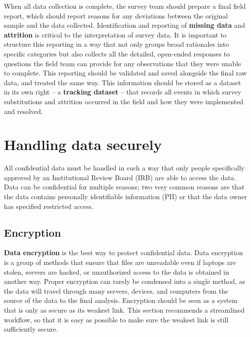 When all data collection is complete,
the survey team should prepare a final field report,
which should report reasons for any deviations between the original sample and the data collected.
Identification and reporting of \textbf{missing data} and \textbf{attrition}
is critical to the interpretation of survey data.
It is important to structure this reporting in a way that not only
groups broad rationales into specific categories
but also collects all the detailed, open-ended responses
to questions the field team can provide for any observations that they were unable to complete.
This reporting should be validated and saved alongside the final raw data, and treated the same way.
This information should be stored as a dataset in its own right
-- a \textbf{tracking dataset} -- that records all events in which survey substitutions
and attrition occurred in the field and how they were implemented and resolved.


\section{Handling data securely}

All confidential data must be handled in such a way that only people specifically
approved by an Institutional Review Board (IRB)
are able to access the data.
Data can be confidential for multiple reasons; two 
very common reasons are that the data contains personally identifiable information (PII)
or that the data owner has specified restricted access.


\subsection{Encryption}

\textbf{Data encryption} is the best way to protect confidential data. 
Data encryption is a group of methods that ensure that files are unreadable
even if laptops are stolen, servers are hacked,
or unauthorized access to the data is obtained in another way.
Proper encryption can rarely be condensed into a single method,
as the data will travel through many servers, devices, and computers
from the source of the data to the final analysis.
Encryption should be seen as a system
that is only as secure as its weakest link.
This section recommends a streamlined workflow,
so that it is easy as possible to make sure
the weakest link is still sufficiently secure.

